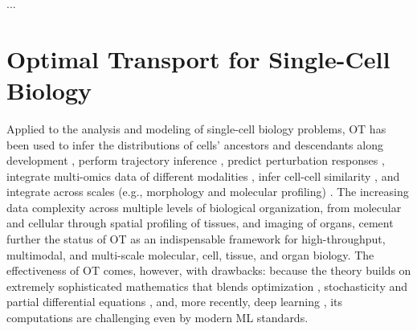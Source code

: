 ...
\citep{fischer2019inferring, busch2015fundamental, hashimoto2016learning, raue2015data2dynamics}

\section{Optimal Transport for Single-Cell Biology}
\label{sec:ot_for_biology}

Applied to the analysis and modeling of single-cell biology problems, OT has been used to infer the distributions of cells' ancestors and descendants along development \citep{schiebinger2019optimal}, perform trajectory inference \citep{bunne2022proximal, forrow2021lineageot, bunne2022recovering, lavenant2021towards, schiebinger2019optimal, tong2020trajectorynet, yang2020predicting, zhang2021optimal, chizat2022trajectory}, predict perturbation responses \citep{bunne2021learning, yang2018scalable, lubeck2022neural}, integrate multi-omics data of different modalities \citep{demetci2022scot}, infer cell-cell similarity \citep{huizing2022optimal}, and integrate across scales (e.g., morphology and molecular profiling) \citep{yang2021multi}. The increasing data complexity across multiple levels of biological organization, from molecular and cellular through spatial profiling \citep{moriel2021novosparc} of tissues, and imaging of organs, cement further the status of OT as an indispensable framework for high-throughput, multimodal, and multi-scale molecular, cell, tissue, and organ biology. The effectiveness of OT comes, however, with drawbacks: because the theory builds on extremely sophisticated mathematics that blends optimization \citep{cuturi2013sinkhorn, cuturi2022optimal}, stochasticity \citep{chizat2022trajectory, bunne2022recovering} and partial differential equations \citep{bunne2022proximal}, and, more recently, deep learning \citep{tong2020trajectorynet, bunne2021learning, bunne2022supervised, yang2018scalable, lubeck2022neural, yang2021multi}, its computations are challenging even by modern ML standards.
